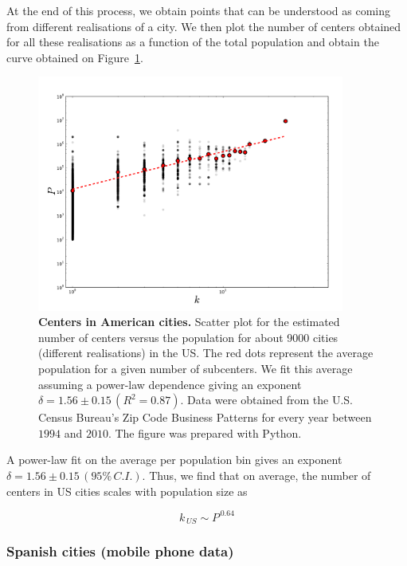 At the end of this process, we obtain points that can be understood as coming
from different realisations of a city. We then plot the number of centers
obtained for all these realisations as a function of the total population and
obtain the curve obtained on Figure~\ref{fig:us_centers}.

\begin{figure}
    \centering
    \includegraphics[width=0.9\textwidth]{gfx/chapter-monocentric/us_num-centers.pdf}
    \caption{{\bf Centers in American cities.} Scatter plot for the estimated number of centers versus the
    population for about 9000 cities (different realisations) in the US. The red
dots represent the average population for a given number of subcenters. We fit
this average assuming a power-law dependence giving an exponent $\delta = 1.56
    \pm 0.15\,(R^2=0.87)$. Data were obtained from the U.S. Census Bureau's Zip
Code Business Patterns for every year between $1994$ and $2010$. The figure was
prepared with Python.\label{fig:us_centers}}
\end{figure}


A power-law fit on the average per population bin gives an exponent $\delta =
1.56 \pm 0.15\,(95\%\,C.I.)$. Thus, we find that on average, the number of
centers in US cities scales with population size as

\begin{equation}
    k_{\,US} \sim P^{\,0.64}
\end{equation}

\subsubsection{Spanish cities (mobile phone data)}
\label{sub:spanish_cities_mobile_phone_data_}

